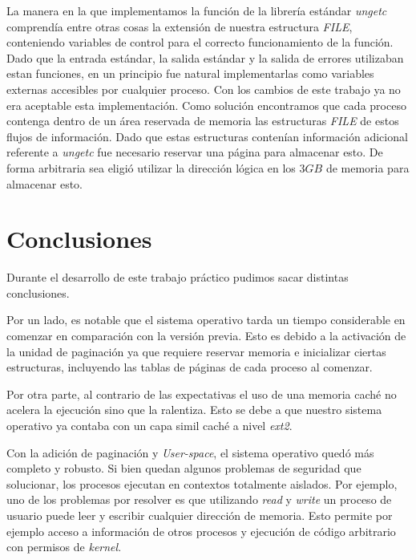 \documentclass[a4paper,10pt]{article}
\begin{document}
	    La manera en la que implementamos la función de la librería estándar \textit{ungetc} comprendía entre otras cosas la
	    extensión de nuestra estructura \textit{FILE}, conteniendo variables de control para el correcto funcionamiento de la función.
	    Dado que la entrada estándar, la salida estándar y la salida de errores utilizaban estan funciones, en un principio fue		
	    natural implementarlas como variables externas accesibles por cualquier proceso. Con los cambios de este trabajo ya no era
	    aceptable esta implementación.
	    Como solución encontramos que cada proceso contenga dentro de un área reservada de memoria las estructuras \textit{FILE} de 
	    estos flujos de información. Dado que estas estructuras contenían información adicional referente a \textit{ungetc} fue 
	    necesario reservar una página para almacenar esto. De forma arbitraria sea eligió utilizar la dirección lógica en los $3GB$ 
	    de memoria para almacenar esto.

\newpage

\section{Conclusiones}

Durante el desarrollo de este trabajo práctico pudimos sacar distintas conclusiones.

Por un lado, es notable que el sistema operativo tarda un tiempo considerable en comenzar en comparación con la versión previa.
Esto es debido a la activación de la unidad de paginación ya que requiere reservar memoria e inicializar ciertas estructuras, 
incluyendo las tablas de páginas de cada proceso al comenzar. 

Por otra parte, al contrario de las expectativas el uso de una memoria caché no acelera la ejecución sino que la ralentiza. Esto se
debe a que nuestro sistema operativo ya contaba con un capa simil caché a nivel \textit{ext2}. 

Con la adición de paginación y \textit{User-space}, el sistema operativo quedó más completo y robusto.
Si bien quedan algunos problemas de seguridad que solucionar, los procesos ejecutan en contextos totalmente aislados.
Por ejemplo, uno de los problemas por resolver es que utilizando \textit{read} y \textit{write} un proceso de usuario puede leer y escribir cualquier dirección de memoria.
Esto permite por ejemplo acceso a información de otros procesos y ejecución de código arbitrario con permisos de \textit{kernel}.
\end{document}
